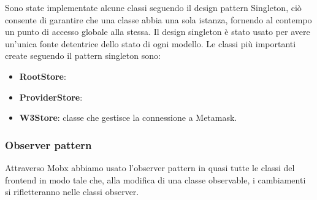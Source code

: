 Sono state implementate alcune classi seguendo il design pattern Singleton,
 ciò consente di garantire che una classe abbia una sola istanza, fornendo al contempo un punto di accesso globale alla stessa.
Il design singleton è stato usato per avere un'unica fonte detentrice dello stato di ogni modello.
Le classi più importanti create seguendo il pattern singleton sono:

\begin{itemize}
    \item \textbf{RootStore}: 
    \item \textbf{ProviderStore}: 
    \item \textbf{W3Store}: classe che gestisce la connessione a Metamask.
\end{itemize}

\subsubsection{Observer pattern}

Attraverso Mobx abbiamo usato l'observer pattern in quasi tutte le classi del frontend in modo tale che, alla modifica di una classe observable, i cambiamenti si rifletteranno nelle classi observer.